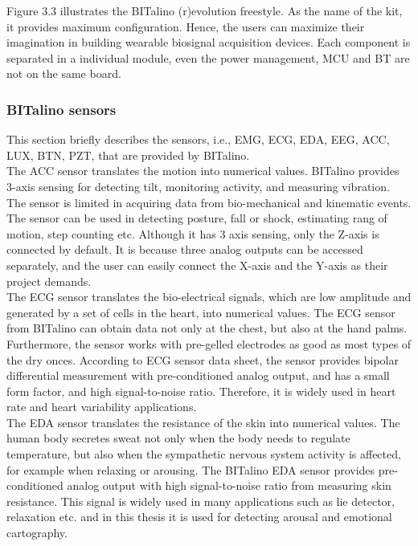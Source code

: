             Figure 3.3 illustrates the BITalino (r)evolution freestyle\cite{BITalino_Freestyle}. As the name of the kit, it provides maximum configuration. Hence, the users can maximize their imagination in building wearable biosignal acquisition devices. Each component is separated in a individual module, even the power management, MCU and BT are not on the same board.\\
        \subsubsection{BITalino sensors}
            This section briefly describes the sensors, i.e., EMG, ECG, EDA, EEG, ACC, LUX, BTN, PZT, that are provided by BITalino.\\
            The ACC sensor translates the motion into numerical values. BITalino provides 3-axis sensing for detecting tilt, monitoring activity, and measuring vibration. The sensor is limited in acquiring data from bio-mechanical and kinematic events. The sensor can be used in detecting posture, fall or shock, estimating rang of motion, step counting etc. Although it has 3 axis sensing, only the Z-axis is connected by default. It is because three analog outputs can be accessed separately, and the user can easily connect the X-axis and the Y-axis as their project demands.\\
            The ECG sensor translates the bio-electrical signals, which are low amplitude and generated by a set of cells in the heart, into numerical values. The ECG sensor from BITalino can obtain data not only at the chest, but also at the hand palms. Furthermore, the sensor works with pre-gelled electrodes as good as most types of the dry onces. According to ECG sensor data sheet, the sensor provides bipolar differential measurement with pre-conditioned analog output, and has a small form factor, and high signal-to-noise ratio. Therefore, it is widely used in heart rate and heart variability applications.\\
            The EDA sensor translates the resistance of the skin into numerical values. The human body secretes sweat not only when the body needs to regulate temperature, but also when the sympathetic nervous system activity is affected, for example when relaxing or arousing. The BITalino EDA sensor provides pre-conditioned analog output with high signal-to-noise ratio from measuring skin resistance. This signal is widely used in many applications such as lie detector, relaxation etc. and in this thesis it is used for detecting arousal and emotional cartography.\\
